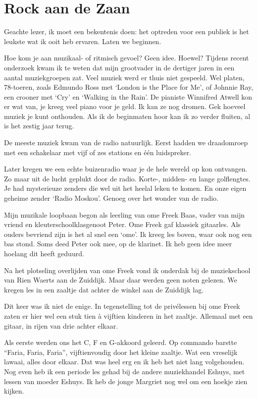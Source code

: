 \documentclass[12pt,twoside, openright]{memoir}
\begin{document}
\section*{Rock aan de Zaan}

\noindent Geachte lezer, ik moet een bekentenis doen: het optreden voor een publiek is het leukste wat ik ooit heb ervaren. Laten we beginnen.

Hoe kom je aan muzikaal- of ritmisch gevoel? Geen idee. Hoewel? Tijdens recent onderzoek kwam ik te weten dat mijn grootvader in de dertiger jaren in een aantal muziekgroepen zat. Veel muziek werd er thuis niet gespeeld. Wel platen, 78-toeren, zoals Edmundo Ross met `London is the Place for Me', of Johnnie Ray, een crooner met `Cry' en `Walking in the Rain'. De pianiste Winnifred Atwell kon er wat van, je kreeg veel piano voor je geld. Ik kan ze nog dromen. Gek hoeveel muziek je kunt onthouden. Als ik de beginmaten hoor kan ik zo verder fluiten, al is het zestig jaar terug. 

De meeste muziek kwam van de radio natuurlijk. Eerst hadden we draadomroep met een schakelaar met vijf of zes stations en één luidspreker. 

Later kregen we een echte buizenradio waar je de hele wereld op kon ontvangen. Zo maar uit de lucht geplukt door de radio. Korte-, midden- en lange golflengtes. Je had mysterieuze zenders die wel uit het heelal leken te komen. En onze eigen geheime zender `Radio Moskou’. Genoeg over het wonder van de radio.

Mijn muzikale loopbaan begon als leerling van ome Freek Baas, vader van mijn vriend en kleuterschoolklasgenoot Peter. Ome Freek gaf klassiek gitaarles. Als ouders bevriend zijn is het al snel een `ome'. Ik kreeg les boven, waar ook nog een bas stond. Soms deed Peter ook mee, op de klarinet. Ik heb geen idee meer hoelang dit heeft geduurd. 

Na het plotseling overlijden van ome Freek vond ik onderdak bij de muziekschool van Rien Waerts aan de Zuiddijk. Maar daar werden geen noten gelezen. We kregen les in een zaaltje dat achter de winkel aan de Zuiddijk lag. 

Dit keer was ik niet de enige. In tegenstelling tot de privélessen bij ome Freek zaten er hier wel een stuk tien à vijftien kinderen in het zaaltje. Allemaal met een gitaar, in rijen van drie achter elkaar. 

Als eerste werden ons het C, F en G-akkoord geleerd. Op commando barstte “Faria, Faria, Faria”, vijftienvoudig door het kleine zaaltje. Wat een vreselijk lawaai, alles door elkaar. Dat was heel erg en ik heb het niet lang volgehouden. Nog even heb ik een periode les gehad bij de andere muziekhandel Eshuys, met lessen van moeder Eshuys. Ik heb de jonge Margriet nog wel om een hoekje zien kijken. 
\end{document}
